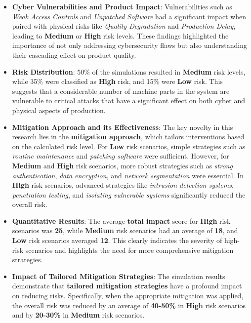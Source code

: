 \documentclass[conference]{IEEEtran}
\begin{document}
\begin{itemize}
    \item \textbf{Cyber Vulnerabilities and Product Impact}: Vulnerabilities such as \textit{Weak Access Controls} and \textit{Unpatched Software} had a significant impact when paired with physical risks like \textit{Quality Degradation} and \textit{Production Delay}, leading to \textbf{Medium} or \textbf{High} risk levels. These findings highlighted the importance of not only addressing cybersecurity flaws but also understanding their cascading effect on product quality.
    \item \textbf{Risk Distribution}: 50\% of the simulations resulted in \textbf{Medium} risk levels, while 35\% were classified as \textbf{High} risk, and 15\% were \textbf{Low} risk. This suggests that a considerable number of machine parts in the system are vulnerable to critical attacks that have a significant effect on both cyber and physical aspects of production.
    \item \textbf{Mitigation Approach and its Effectiveness}: The key novelty in this research lies in the \textbf{mitigation approach}, which tailors interventions based on the calculated risk level. For \textbf{Low} risk scenarios, simple strategies such as \textit{routine maintenance} and \textit{patching software} were sufficient. However, for \textbf{Medium} and \textbf{High} risk scenarios, more robust strategies such as \textit{strong authentication}, \textit{data encryption}, and \textit{network segmentation} were essential. In \textbf{High} risk scenarios, advanced strategies like \textit{intrusion detection systems}, \textit{penetration testing}, and \textit{isolating vulnerable systems} significantly reduced the overall risk.
    \item \textbf{Quantitative Results}: The average \textbf{total impact} score for \textbf{High} risk scenarios was \textbf{25}, while \textbf{Medium} risk scenarios had an average of \textbf{18}, and \textbf{Low} risk scenarios averaged \textbf{12}. This clearly indicates the severity of high-risk scenarios and highlights the need for more comprehensive mitigation strategies.
    \item \textbf{Impact of Tailored Mitigation Strategies}: The simulation results demonstrate that \textbf{tailored mitigation strategies} have a profound impact on reducing risks. Specifically, when the appropriate mitigation was applied, the overall risk was reduced by an average of \textbf{40-50\%} in \textbf{High} risk scenarios and by \textbf{20-30\%} in \textbf{Medium} risk scenarios.
\end{itemize}
\end{document}
